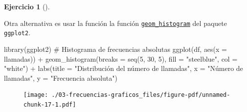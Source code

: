 \documentclass[
  a4paper,
]{scrreport}
\newenvironment{Shaded}{\begin{snugshade}}{\end{snugshade}}
\newcommand{\AttributeTok}[1]{\textcolor[rgb]{0.40,0.45,0.13}{#1}}
\newcommand{\CommentTok}[1]{\textcolor[rgb]{0.37,0.37,0.37}{#1}}
\newcommand{\DecValTok}[1]{\textcolor[rgb]{0.68,0.00,0.00}{#1}}
\newcommand{\FunctionTok}[1]{\textcolor[rgb]{0.28,0.35,0.67}{#1}}
\newcommand{\NormalTok}[1]{\textcolor[rgb]{0.00,0.23,0.31}{#1}}
\newcommand{\SpecialCharTok}[1]{\textcolor[rgb]{0.37,0.37,0.37}{#1}}
\newcommand{\StringTok}[1]{\textcolor[rgb]{0.13,0.47,0.30}{#1}}
\theoremstyle{definition}
\newtheorem{exercise}{Ejercicio}[chapter]
\theoremstyle{remark}
\begin{document}
\begin{exercise}[]
\begin{tcolorbox}
\begin{figure}[H]
\end{figure}

\end{tcolorbox}

\begin{tcolorbox}[enhanced jigsaw, rightrule=.15mm, toptitle=1mm, colbacktitle=quarto-callout-tip-color!10!white, titlerule=0mm, colback=white, leftrule=.75mm, bottomtitle=1mm, colframe=quarto-callout-tip-color-frame, breakable, title=\textcolor{quarto-callout-tip-color}{\faLightbulb}\hspace{0.5em}{Solución 2}, arc=.35mm, coltitle=black, opacityback=0, bottomrule=.15mm, opacitybacktitle=0.6, left=2mm, toprule=.15mm]

Otra alternativa es usar la función la función
\href{https://aprendeconalf.es/manual-r/07-graficos.html\#histogramas}{\texttt{geom\_histogram}}
del paquete \texttt{ggplot2}.

\begin{Shaded}
\begin{Highlighting}[]
\FunctionTok{library}\NormalTok{(ggplot2)}
\CommentTok{\# Histograma de frecuencias absolutas}
\FunctionTok{ggplot}\NormalTok{(df, }\FunctionTok{aes}\NormalTok{(}\AttributeTok{x =}\NormalTok{ llamadas)) }\SpecialCharTok{+}
    \FunctionTok{geom\_histogram}\NormalTok{(}\AttributeTok{breaks =} \FunctionTok{seq}\NormalTok{(}\DecValTok{5}\NormalTok{, }\DecValTok{30}\NormalTok{, }\DecValTok{5}\NormalTok{), }\AttributeTok{fill =} \StringTok{"steelblue"}\NormalTok{, }\AttributeTok{col =} \StringTok{"white"}\NormalTok{) }\SpecialCharTok{+} 
    \FunctionTok{labs}\NormalTok{(}\AttributeTok{title =} \StringTok{"Distribución del número de llamadas"}\NormalTok{, }\AttributeTok{x =} \StringTok{"Número de llamadas"}\NormalTok{, }\AttributeTok{y =} \StringTok{"Frecuencia absoluta"}\NormalTok{)}
\end{Highlighting}
\end{Shaded}

\begin{figure}[H]

{\centering \texttt{[image: ./03-frecuencias-graficos\_files/figure-pdf/unnamed-chunk-17-1.pdf]}

}

\end{figure}


\end{tcolorbox}
\end{exercise}
\end{document}
